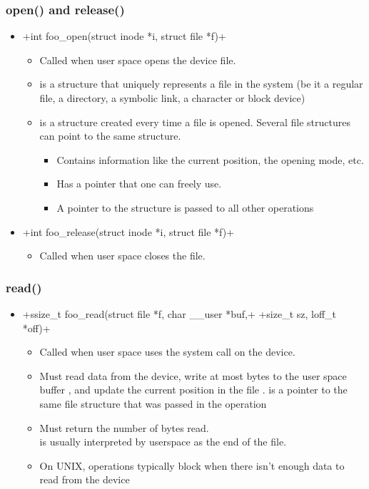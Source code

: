 \begin{frame}[fragile]
  \frametitle{open() and release()}
  \begin{itemize}
  \item {}+int foo_open(struct inode *i, struct file *f)+
    \begin{itemize}
    \item Called when user space opens the device file.
    \item {} is a structure that uniquely represents a file
      in the system (be it a regular file, a directory, a symbolic
      link, a character or block device)
    \item {} is a structure created every time a file is
      opened. Several file structures can point to the same
       structure.
      \begin{itemize}
      \item Contains information like the current position, the
        opening mode, etc.
      \item Has a  pointer that one can
        freely use.
      \item A pointer to the  structure is passed to all other
        operations
      \end{itemize}
    \end{itemize}
  \item {}+int foo_release(struct inode *i, struct file *f)+
    \begin{itemize}
    \item Called when user space closes the file.
    \end{itemize}
  \end{itemize}
\end{frame}

\begin{frame}
  \frametitle{read()}
  \begin{itemize}
  \item {}+ssize_t foo_read(struct file *f, char __user *buf,+
    +size_t sz, loff_t *off)+
    \begin{itemize}
    \item Called when user space uses the  system call on
      the device.
    \item Must read data from the device, write at most 
      bytes to the user space buffer , and update the
      current position in the file .  is a pointer
      to the same file structure that was passed in the 
      operation
    \item Must return the number of bytes read.\\
	   is usually interpreted by userspace as the end of
          the file.
    \item On UNIX,  operations typically block when there
      isn't enough data to read from the device
    \end{itemize}
  \end{itemize}
\end{frame}


